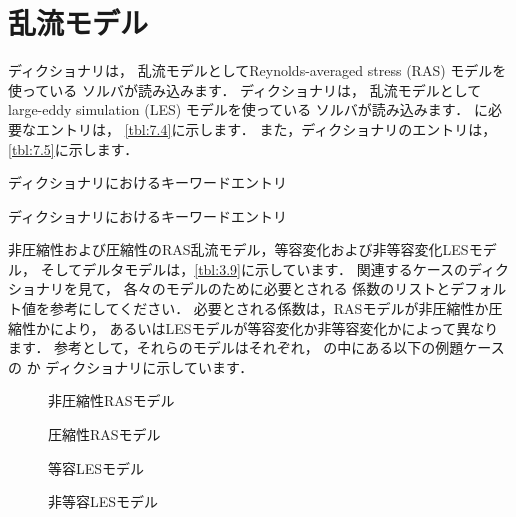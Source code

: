 \section{乱流モデル}
\label{sec:7.2}
%
%
ディクショナリは，
乱流モデルとしてReynolds-averaged stress (RAS) モデルを使っている
ソルバが読み込みます．
%
%
ディクショナリは，
乱流モデルとしてlarge-eddy simulation (LES) モデルを使っている
ソルバが読み込みます．
に必要なエントリは，
\autoref{tbl:7.4}に示します．
また，ディクショナリのエントリは，
\autoref{tbl:7.5}に示します．


\begin{table}[ht]
 
 \caption{ディクショナリにおけるキーワードエントリ}
 \label{tbl:7.4}
\end{table}


\begin{table}[ht]
 
 \caption{ディクショナリにおけるキーワードエントリ}
 \label{tbl:7.5}
\end{table}


非圧縮性および圧縮性のRAS乱流モデル，等容変化および非等容変化LESモデル，
そしてデルタモデルは，\autoref{tbl:3.9}に示しています．
関連するケースのディクショナリを見て，
各々のモデルのために必要とされる
係数のリストとデフォルト値を参考にしてください．
必要とされる係数は，RASモデルが非圧縮性か圧縮性かにより，
あるいはLESモデルが等容変化か非等容変化かによって異なります．
参考として，それらのモデルはそれぞれ，
の中にある以下の例題ケースの
か
ディクショナリに示しています．
\begin{description}
 \item[] 非圧縮性RASモデル
 \item[] 圧縮性RASモデル
 \item[] 等容LESモデル
 \item[] 非等容LESモデル
\end{description}
